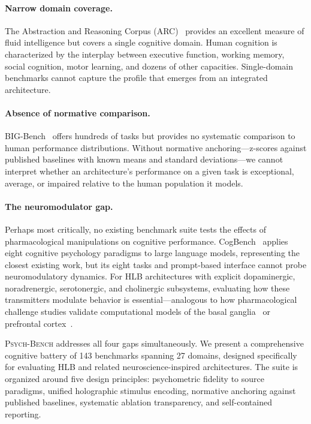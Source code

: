 \documentclass[11pt,letterpaper]{article}
\newcommand{\psychbench}{\textsc{Psych-Bench}}
\newcommand{\hlb}{\textsc{HLB}}
\begin{document}
\paragraph{Narrow domain coverage.} The Abstraction and Reasoning Corpus (ARC)~\citep{chollet2019measure} provides an excellent measure of fluid intelligence but covers a single cognitive domain. Human cognition is characterized by the interplay between executive function, working memory, social cognition, motor learning, and dozens of other capacities. Single-domain benchmarks cannot capture the profile that emerges from an integrated architecture.

\paragraph{Absence of normative comparison.} BIG-Bench~\citep{srivastava2023beyond} offers hundreds of tasks but provides no systematic comparison to human performance distributions. Without normative anchoring---z-scores against published baselines with known means and standard deviations---we cannot interpret whether an architecture's performance on a given task is exceptional, average, or impaired relative to the human population it models.

\paragraph{The neuromodulator gap.} Perhaps most critically, no existing benchmark suite tests the effects of pharmacological manipulations on cognitive performance. CogBench~\citep{codaforno2024cogbench} applies eight cognitive psychology paradigms to large language models, representing the closest existing work, but its eight tasks and prompt-based interface cannot probe neuromodulatory dynamics. For \hlb{} architectures with explicit dopaminergic, noradrenergic, serotonergic, and cholinergic subsystems, evaluating how these transmitters modulate behavior is essential---analogous to how pharmacological challenge studies validate computational models of the basal ganglia~\citep{doya2002metalearning} or prefrontal cortex~\citep{arnsten2011catecholamine}.

\psychbench{} addresses all four gaps simultaneously. We present a comprehensive cognitive battery of 143 benchmarks spanning 27 domains, designed specifically for evaluating \hlb{} and related neuroscience-inspired architectures. The suite is organized around five design principles: psychometric fidelity to source paradigms, unified holographic stimulus encoding, normative anchoring against published baselines, systematic ablation transparency, and self-contained reporting.
\end{document}
